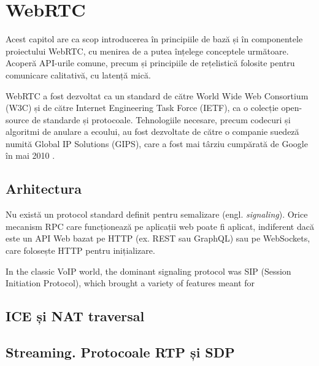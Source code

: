 \chapter{WebRTC}
\label{chap:ch3}

\indent \par Acest capitol are ca scop introducerea în principiile de bază și în componentele proiectului WebRTC, cu menirea de a putea înțelege conceptele următoare. Acoperă API-urile comune, precum și principiile de rețelistică folosite pentru comunicare calitativă, cu latență mică.

\indent \par WebRTC a fost dezvoltat ca un standard de către World Wide Web Consortium (W3C) și de către Internet Engineering Task Force (IETF), ca o colecție open-source de standarde și protocoale. Tehnologiile necesare, precum codecuri și algoritmi de anulare a ecoului, au fost dezvoltate de către o companie suedeză numită Global IP Solutions (GIPS), care a fost mai târziu cumpărată de Google în mai 2010 \cite{WebNSM2017}.

\section{Arhitectura}
\label{sec:ch3sec1}

\indent \par Nu există un protocol standard definit pentru semalizare (engl. \textit{signaling}). Orice mecanism RPC care funcționează pe aplicații web poate fi aplicat, indiferent dacă este un API Web bazat pe HTTP (ex. REST sau GraphQL) sau pe WebSockets, care folosește HTTP pentru inițializare. 
\indent \par In the classic VoIP world, the dominant signaling protocol was SIP (Session Initiation Protocol), which brought a variety of features meant for 


\section{ICE și NAT traversal}
\label{sec:ch3sec2}

\section{Streaming. Protocoale RTP și SDP}
\label{sec:ch3sec3}

